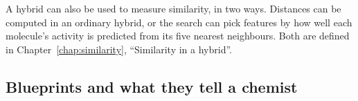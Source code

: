 A hybrid can also be used to measure similarity, in two ways. Distances can be computed in an ordinary hybrid, or the search can pick features by how well each molecule's activity is predicted from its five nearest neighbours. Both are defined in Chapter~\ref{chap:similarity}, ``Similarity in a hybrid''.


\subsection{Blueprints and what they tell a chemist}
